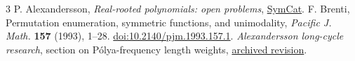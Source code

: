 \documentclass[11pt]{article}
\begin{document}
\begin{thebibliography}{3}
 P. Alexandersson, \emph{Real-rooted polynomials: open problems}, \href{https://www.symmetricfunctions.com/realRootedOpenProblems.htm\#permutations-with-long-cycles}{SymCat}.
 F. Brenti, Permutation enumeration, symmetric functions, and unimodality, \emph{Pacific J. Math.} \textbf{157} (1993), 1--28. \href{https://doi.org/10.2140/pjm.1993.157.1}{doi:10.2140/pjm.1993.157.1}.
 \emph{Alexandersson long-cycle research}, section on P\'olya-frequency length weights, \href{https://github.com/1337isnot1337/solved-conjectures/blob/0c07434ef991b853528ca55926b3b83820b7f58d/docs/alexandersson-long-cycle-research.md}{archived revision}.
\end{thebibliography}
\end{document}
